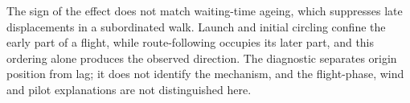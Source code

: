 The sign of the effect does not match waiting-time ageing, which suppresses late
displacements in a subordinated walk. Launch and initial circling confine the early
part of a flight, while route-following occupies its later part, and this ordering
alone produces the observed direction. The diagnostic separates origin position from
lag; it does not identify the mechanism, and the flight-phase, wind and pilot
explanations are not distinguished here.
\FloatBarrier
